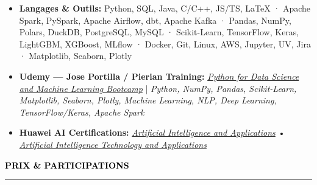 \documentclass[10pt,english,french]{article}
\newcommand{\awardIcon}[1][black]{\textcolor{#1}{\faTrophy}}
\newcommand{\cvsection}[1]{
    \vspace{4pt}
    \textbf{\fontsize{9pt}{10pt}\selectfont \textcolor{black}{#1}}
    \vspace{6pt}
    \hrule
    \vspace{6pt}
}
\begin{document}
\vspace{-4pt}
\begin{itemize}[leftmargin=0.5cm, label=\textbullet, itemsep=0.2em]
    \item \textbf{Langages \& Outils\!:}
          Python, SQL, Java, C/C++, JS/TS, LaTeX ·
          Apache Spark, PySpark, Apache Airflow, dbt, Apache Kafka ·
          Pandas, NumPy, Polars, DuckDB, PostgreSQL, MySQL ·
          Scikit-Learn, TensorFlow, Keras, LightGBM, XGBoost, MLflow ·
          Docker, Git, Linux, AWS, Jupyter, UV, Jira ·
          Matplotlib, Seaborn, Plotly

    \item \textbf{Udemy --- Jose Portilla / Pierian Training\!:}
          \href{https://www.udemy.com/certificate/UC-51319000-ccb8-4c9c-9320-6cd9860e601c/}
          {\textit{Python for Data Science and Machine Learning Bootcamp}}
          |
          \textit{Python, NumPy, Pandas, Scikit-Learn, Matplotlib, Seaborn, Plotly,
              Machine Learning, NLP, Deep Learning, TensorFlow/Keras, Apache Spark}

    \item \textbf{Huawei AI Certifications:}
          \href{https://github.com/DmytroPalahin/cv-latex-simple-en/blob/main/docs/huawei_artificial_intelligence_and_applications.pdf}
          {\textit{Artificial Intelligence and Applications}}
          \hspace{4pt}•\hspace{4pt}
          \href{https://github.com/DmytroPalahin/cv-latex-simple-en/blob/main/docs/huawei_artificial_intelligence_technology_and_applications.pdf}
          {\textit{Artificial Intelligence Technology and Applications}}


\end{itemize}

\vspace{-3pt}
\cvsection{\awardIcon[black]\hspace{4pt}PRIX \& PARTICIPATIONS}
\end{document}
